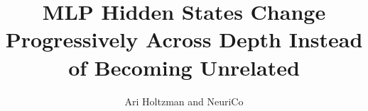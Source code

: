 \documentclass{article}
\title{MLP Hidden States Change Progressively Across Depth Instead of Becoming Unrelated}
\author{Ari Holtzman and NeuriCo}
\begin{document}
\maketitle

\begin{abstract}

\end{abstract}









\end{document}
